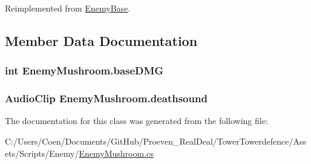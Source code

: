 Reimplemented from \hyperlink{class_enemy_base_a885f490a36e40840c886f9298ed3f2b7}{Enemy\+Base}.



\subsection{Member Data Documentation}
\subsubsection[{\texorpdfstring{base\+D\+MG}{baseDMG}}]{\setlength{\rightskip}{0pt plus 5cm}int Enemy\+Mushroom.\+base\+D\+MG}\hypertarget{class_enemy_mushroom_ae372614c05e881d8f42e8ab542296804}{}\label{class_enemy_mushroom_ae372614c05e881d8f42e8ab542296804}
\subsubsection[{\texorpdfstring{deathsound}{deathsound}}]{\setlength{\rightskip}{0pt plus 5cm}Audio\+Clip Enemy\+Mushroom.\+deathsound}\hypertarget{class_enemy_mushroom_a8dc03d1fdf23ee49f6772d3c81a71ab2}{}\label{class_enemy_mushroom_a8dc03d1fdf23ee49f6772d3c81a71ab2}


The documentation for this class was generated from the following file\+:\begin{DoxyCompactItemize}
\item 
C\+:/\+Users/\+Coen/\+Documents/\+Git\+Hub/\+Proeven\+\_\+\+Real\+Deal/\+Tower\+Towerdefence/\+Assets/\+Scripts/\+Enemy/\hyperlink{_enemy_mushroom_8cs}{Enemy\+Mushroom.\+cs}\end{DoxyCompactItemize}
